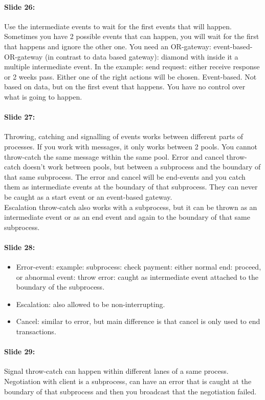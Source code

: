 \documentclass[10pt,a4paper]{report}
\begin{document}
\paragraph{Slide 26:}Use the intermediate events to wait for the first events that will happen. Sometimes you have 2 possible events that can happen, you will wait for the first that happens and ignore the other one. You need an OR-gateway: event-based-OR-gateway (in contrast to data based gateway): diamond with inside it a multiple intermediate event. In the example: send request: either receive response or 2 weeks pass. Either one of the right actions will be chosen. Event-based. Not based on data, but on the first event that happens. You have no control over what is going to happen.

\paragraph{Slide 27:}Throwing, catching and signalling of events works between different parts of processes. If you work with messages, it only works between 2 pools. You cannot throw-catch the same message within the same pool. Error and cancel throw-catch doesn't work between pools, but between a subprocess and the boundary of that same subprocess. The error and cancel will be end-events and you catch them as intermediate events at the boundary of that subprocess. They can never be caught as a start event or an event-based gateway.\\
Escalation throw-catch also works with a subprocess, but it can be thrown as an intermediate event or as an end event and again to the boundary of that same subprocess.

\paragraph{Slide 28:}
\begin{itemize}
\item Error-event: example: subprocess: check payment: either normal end: proceed, or abnormal event: throw error: caught as intermediate event attached to the boundary of the subprocess.
\item Escalation: also allowed to be non-interrupting.
\item Cancel: similar to error, but main difference is that cancel is only used to end transactions.
\end{itemize}
	
\paragraph{Slide 29:}Signal throw-catch can happen within different lanes of a same process. Negotiation with client is a subprocess, can have an error that is caught at the boundary of that subprocess and then you broadcast that the negotiation failed. 
\end{document}
